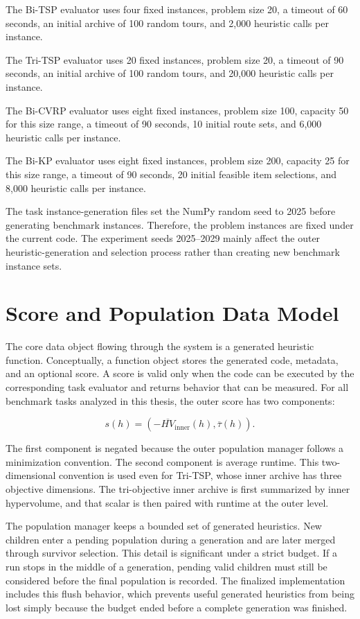The Bi-TSP evaluator uses four fixed instances, problem size 20, a timeout of 60 seconds, an initial archive of 100 random tours, and 2,000 heuristic calls per instance.

The Tri-TSP evaluator uses 20 fixed instances, problem size 20, a timeout of 90 seconds, an initial archive of 100 random tours, and 20,000 heuristic calls per instance.

The Bi-CVRP evaluator uses eight fixed instances, problem size 100, capacity 50 for this size range, a timeout of 90 seconds, 10 initial route sets, and 6,000 heuristic calls per instance.

The Bi-KP evaluator uses eight fixed instances, problem size 200, capacity 25 for this size range, a timeout of 90 seconds, 20 initial feasible item selections, and 8,000 heuristic calls per instance.

The task instance-generation files set the NumPy random seed to 2025 before generating benchmark instances. Therefore, the problem instances are fixed under the current code. The experiment seeds 2025--2029 mainly affect the outer heuristic-generation and selection process rather than creating new benchmark instance sets.

\section{Score and Population Data Model}

The core data object flowing through the system is a generated heuristic function. Conceptually, a function object stores the generated code, metadata, and an optional score. A score is valid only when the code can be executed by the corresponding task evaluator and returns behavior that can be measured. For all benchmark tasks analyzed in this thesis, the outer score has two components:

\begin{equation}
  s(h) = \left(-\overline{HV}_{\mathrm{inner}}(h), \overline{\tau}(h)\right).
\end{equation}

The first component is negated because the outer population manager follows a minimization convention. The second component is average runtime. This two-dimensional convention is used even for Tri-TSP, whose inner archive has three objective dimensions. The tri-objective inner archive is first summarized by inner hypervolume, and that scalar is then paired with runtime at the outer level.

The population manager keeps a bounded set of generated heuristics. New children enter a pending population during a generation and are later merged through survivor selection. This detail is significant under a strict budget. If a run stops in the middle of a generation, pending valid children must still be considered before the final population is recorded. The finalized implementation includes this flush behavior, which prevents useful generated heuristics from being lost simply because the budget ended before a complete generation was finished.

